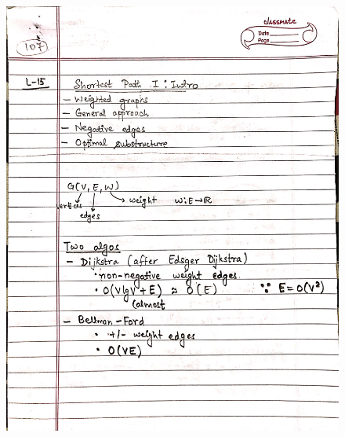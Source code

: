 \begin{figure}[H]
    \centering
    \includegraphics[width=16cm, height=21cm]{"./MIT-6.006/MIT-6006-107"}
\end{figure}
\newpage
